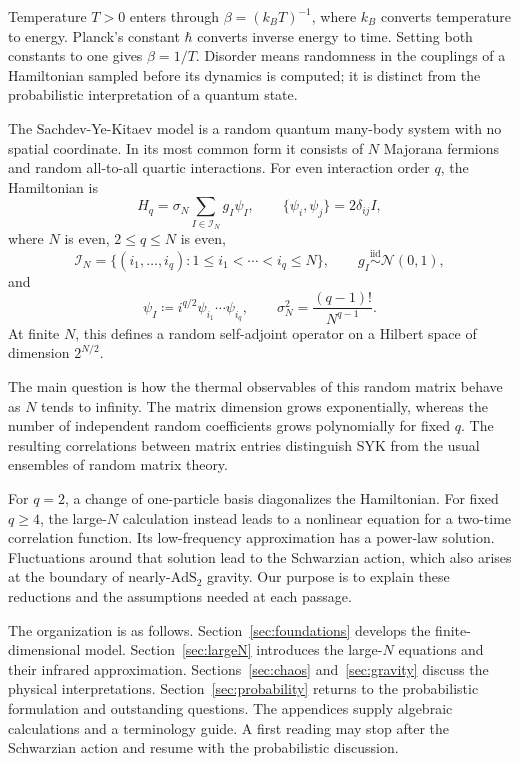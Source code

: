 \documentclass[11pt]{article}
\numberwithin{equation}{section}
\theoremstyle{exposition}
\theoremstyle{result}
\newcommand{\AdS}{\mathrm{AdS}}
\begin{document}
Temperature $T>0$ enters through $\beta=(k_BT)^{-1}$, where $k_B$ converts temperature to energy. Planck's constant $\hbar$ converts inverse energy to time. Setting both constants to one gives $\beta=1/T$. Disorder means randomness in the couplings of a Hamiltonian sampled before its dynamics is computed; it is distinct from the probabilistic interpretation of a quantum state.

The Sachdev-Ye-Kitaev model is a random quantum many-body system with no spatial coordinate. In its most common form it consists of $N$ Majorana fermions and random all-to-all quartic interactions. For even interaction order $q$, the Hamiltonian is
\begin{equation}
H_q=\sigma_N\sum_{I\in\mathcal I_N}g_I\psi_I,
\qquad
\{\psi_i,\psi_j\}=2\delta_{ij}I,
\label{eq:SYKH}
\end{equation}
where $N$ is even, $2\leq q\leq N$ is even,
\begin{equation}
\mathcal I_N=\{(i_1,\ldots,i_q):1\le i_1<\cdots<i_q\le N\},
\qquad
g_I\overset{\mathrm{iid}}\sim\mathcal N(0,1),
\label{eq:variance}
\end{equation}
and
\begin{equation*}
\psi_I\coloneqq i^{q/2}\psi_{i_1}\cdots\psi_{i_q},
\qquad
\sigma_N^2=\frac{(q-1)!}{N^{q-1}}.
\end{equation*}
At finite $N$, this defines a random self-adjoint operator on a Hilbert space of dimension $2^{N/2}$.

The main question is how the thermal observables of this random matrix behave as $N$ tends to infinity. The matrix dimension grows exponentially, whereas the number of independent random coefficients grows polynomially for fixed $q$. The resulting correlations between matrix entries distinguish SYK from the usual ensembles of random matrix theory.

For $q=2$, a change of one-particle basis diagonalizes the Hamiltonian. For fixed $q\geq4$, the large-$N$ calculation instead leads to a nonlinear equation for a two-time correlation function. Its low-frequency approximation has a power-law solution. Fluctuations around that solution lead to the Schwarzian action, which also arises at the boundary of nearly-$\AdS_2$ gravity. Our purpose is to explain these reductions and the assumptions needed at each passage.

The organization is as follows. Section~\ref{sec:foundations} develops the finite-dimensional model. Section~\ref{sec:largeN} introduces the large-$N$ equations and their infrared approximation. Sections~\ref{sec:chaos} and~\ref{sec:gravity} discuss the physical interpretations. Section~\ref{sec:probability} returns to the probabilistic formulation and outstanding questions. The appendices supply algebraic calculations and a terminology guide. A first reading may stop after the Schwarzian action and resume with the probabilistic discussion.
\end{document}
